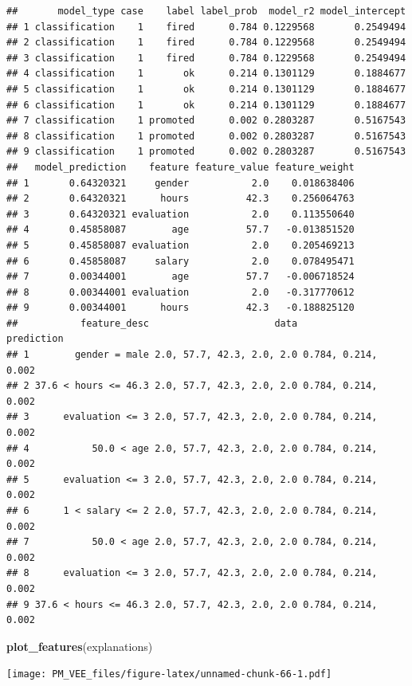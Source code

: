 \documentclass[12pt,]{krantz}
\newenvironment{Shaded}{\begin{snugshade}}{\end{snugshade}}
\newcommand{\KeywordTok}[1]{\textcolor[rgb]{0.13,0.29,0.53}{\textbf{#1}}}
\newcommand{\NormalTok}[1]{#1}
\theoremstyle{definition}
\theoremstyle{definition}
\theoremstyle{definition}
\theoremstyle{remark}
\begin{document}
\begin{verbatim}
##       model_type case    label label_prob  model_r2 model_intercept
## 1 classification    1    fired      0.784 0.1229568       0.2549494
## 2 classification    1    fired      0.784 0.1229568       0.2549494
## 3 classification    1    fired      0.784 0.1229568       0.2549494
## 4 classification    1       ok      0.214 0.1301129       0.1884677
## 5 classification    1       ok      0.214 0.1301129       0.1884677
## 6 classification    1       ok      0.214 0.1301129       0.1884677
## 7 classification    1 promoted      0.002 0.2803287       0.5167543
## 8 classification    1 promoted      0.002 0.2803287       0.5167543
## 9 classification    1 promoted      0.002 0.2803287       0.5167543
##   model_prediction    feature feature_value feature_weight
## 1       0.64320321     gender           2.0    0.018638406
## 2       0.64320321      hours          42.3    0.256064763
## 3       0.64320321 evaluation           2.0    0.113550640
## 4       0.45858087        age          57.7   -0.013851520
## 5       0.45858087 evaluation           2.0    0.205469213
## 6       0.45858087     salary           2.0    0.078495471
## 7       0.00344001        age          57.7   -0.006718524
## 8       0.00344001 evaluation           2.0   -0.317770612
## 9       0.00344001      hours          42.3   -0.188825120
##           feature_desc                      data          prediction
## 1        gender = male 2.0, 57.7, 42.3, 2.0, 2.0 0.784, 0.214, 0.002
## 2 37.6 < hours <= 46.3 2.0, 57.7, 42.3, 2.0, 2.0 0.784, 0.214, 0.002
## 3      evaluation <= 3 2.0, 57.7, 42.3, 2.0, 2.0 0.784, 0.214, 0.002
## 4           50.0 < age 2.0, 57.7, 42.3, 2.0, 2.0 0.784, 0.214, 0.002
## 5      evaluation <= 3 2.0, 57.7, 42.3, 2.0, 2.0 0.784, 0.214, 0.002
## 6      1 < salary <= 2 2.0, 57.7, 42.3, 2.0, 2.0 0.784, 0.214, 0.002
## 7           50.0 < age 2.0, 57.7, 42.3, 2.0, 2.0 0.784, 0.214, 0.002
## 8      evaluation <= 3 2.0, 57.7, 42.3, 2.0, 2.0 0.784, 0.214, 0.002
## 9 37.6 < hours <= 46.3 2.0, 57.7, 42.3, 2.0, 2.0 0.784, 0.214, 0.002
\end{verbatim}

\begin{Shaded}
\begin{Highlighting}[]
\KeywordTok{plot_features}\NormalTok{(explanations)}
\end{Highlighting}
\end{Shaded}

\texttt{[image: PM\_VEE\_files/figure-latex/unnamed-chunk-66-1.pdf]}
\end{document}
